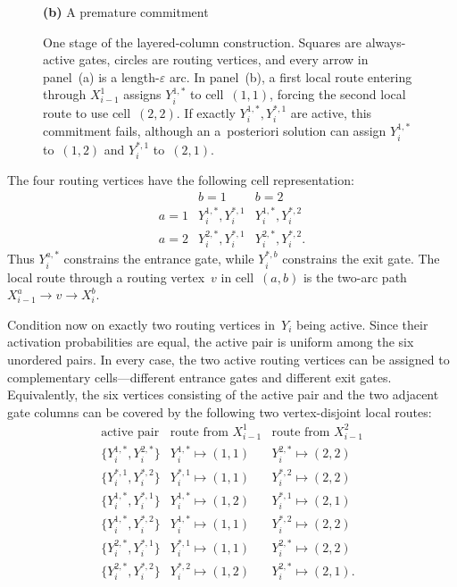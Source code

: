 \documentclass[12pt,a4paper,oneside]{report}
\begin{document}
\begin{figure}[!htbp]
\begin{minipage}[c]{0.42\textwidth}
\vspace{1.5em}
\smallskip
\textbf{(b)} A premature commitment
\end{minipage}
\caption{One stage of the layered-column construction.  Squares are
always-active gates, circles are routing vertices, and every arrow in
panel~(a) is a length-$\varepsilon$ arc.  In panel~(b), a first local route
entering through $X_{i-1}^1$ assigns $Y_i^{1,\ast}$ to cell~$(1,1)$,
forcing the second local route to use cell~$(2,2)$.  If exactly
$Y_i^{1,\ast},Y_i^{\ast,1}$ are active, this commitment fails, although an
a~posteriori solution can assign $Y_i^{1,\ast}$ to~$(1,2)$ and
$Y_i^{\ast,1}$ to~$(2,1)$.}
\label{fig:layered-column-stage}
\end{figure}

The four routing vertices have the following cell representation:
\begin{equation}\label{eq:layered-column-matrix}
\begin{array}{c|cc}
&b=1&b=2\\ \hline
a=1&Y_i^{1,\ast},Y_i^{\ast,1}&Y_i^{1,\ast},Y_i^{\ast,2}\\
a=2&Y_i^{2,\ast},Y_i^{\ast,1}&Y_i^{2,\ast},Y_i^{\ast,2}.
\end{array}
\end{equation}
Thus $Y_i^{a,\ast}$ constrains the entrance gate, while $Y_i^{\ast,b}$
constrains the exit gate.  The local route through a routing vertex~$v$ in
cell~$(a,b)$ is the two-arc path $X_{i-1}^a\to v\to X_i^b$.

Condition now on exactly two routing vertices in~$Y_i$ being active.  Since
their activation probabilities are equal, the active pair is uniform among
the six unordered pairs.  In every case, the two active routing vertices can
be assigned to complementary cells---different entrance gates and different
exit gates.  Equivalently, the six vertices consisting of the active pair
and the two adjacent gate columns can be covered by the following two
vertex-disjoint local routes:
\[
\begin{array}{c|cc}
\text{active pair}
    &\text{route from }X_{i-1}^1
    &\text{route from }X_{i-1}^2\\ \hline
\{Y_i^{1,\ast},Y_i^{2,\ast}\}
    &Y_i^{1,\ast}\mapsto(1,1)&Y_i^{2,\ast}\mapsto(2,2)\\
\{Y_i^{\ast,1},Y_i^{\ast,2}\}
    &Y_i^{\ast,1}\mapsto(1,1)&Y_i^{\ast,2}\mapsto(2,2)\\
\{Y_i^{1,\ast},Y_i^{\ast,1}\}
    &Y_i^{1,\ast}\mapsto(1,2)&Y_i^{\ast,1}\mapsto(2,1)\\
\{Y_i^{1,\ast},Y_i^{\ast,2}\}
    &Y_i^{1,\ast}\mapsto(1,1)&Y_i^{\ast,2}\mapsto(2,2)\\
\{Y_i^{2,\ast},Y_i^{\ast,1}\}
    &Y_i^{\ast,1}\mapsto(1,1)&Y_i^{2,\ast}\mapsto(2,2)\\
\{Y_i^{2,\ast},Y_i^{\ast,2}\}
    &Y_i^{\ast,2}\mapsto(1,2)&Y_i^{2,\ast}\mapsto(2,1).
\end{array}
\]
\end{document}
